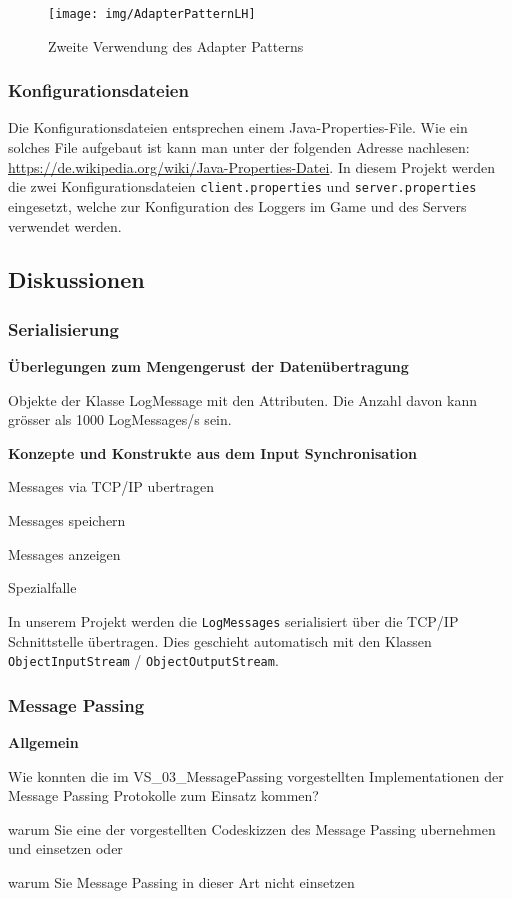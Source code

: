 \documentclass[12pt,a4paper,twosided]{scrartcl}
\newenvironment{tight_enumerate}{
\begin{enumerate}
	\setlength{\itemsep}{0pt}
	\setlength{\parskip}{0pt}
}{\end{enumerate}}
\begin{document}
\begin{figure}[h]
	\centering
	\texttt{[image: img/AdapterPatternLH]}
	\caption{Zweite Verwendung des Adapter Patterns}
	\label{fig:adapterpatternlh}
\end{figure}

\subsubsection{Konfigurationsdateien}
Die Konfigurationsdateien entsprechen einem Java-Properties-File. Wie ein solches File aufgebaut ist kann man unter der folgenden Adresse nachlesen: \url{https://de.wikipedia.org/wiki/Java-Properties-Datei}. In diesem Projekt werden die zwei Konfigurationsdateien \texttt{client.properties} und \texttt{server.properties} eingesetzt, welche zur Konfiguration des Loggers im Game und des Servers verwendet werden.

\subsection{Diskussionen}

\subsubsection{Serialisierung}
\textbf{Überlegungen zum Mengengerust der Datenübertragung}

Objekte der Klasse LogMessage mit den Attributen. Die Anzahl davon kann grösser als 1000 LogMessages/s sein.

\textbf{Konzepte und Konstrukte aus dem Input Synchronisation}

\begin{tight_enumerate}
	\item Messages via TCP/IP ubertragen
	\item Messages speichern
	\item Messages anzeigen
	\item Spezialfalle
\end{tight_enumerate}

In unserem Projekt werden die \texttt{LogMessages} serialisiert über die TCP/IP Schnittstelle übertragen. Dies geschieht automatisch mit den Klassen \texttt{ObjectInputStream} / \texttt{ObjectOutputStream}.

\subsubsection{Message Passing}
\textbf{Allgemein}
\begin{tight_enumerate}
	\item Wie konnten die im VS\_03\_MessagePassing vorgestellten Implementationen der Message Passing Protokolle zum Einsatz kommen?
	\item warum Sie eine der vorgestellten Codeskizzen des Message Passing ubernehmen und einsetzen oder
	\item warum Sie Message Passing in dieser Art nicht einsetzen
\end{tight_enumerate}
\end{document}
